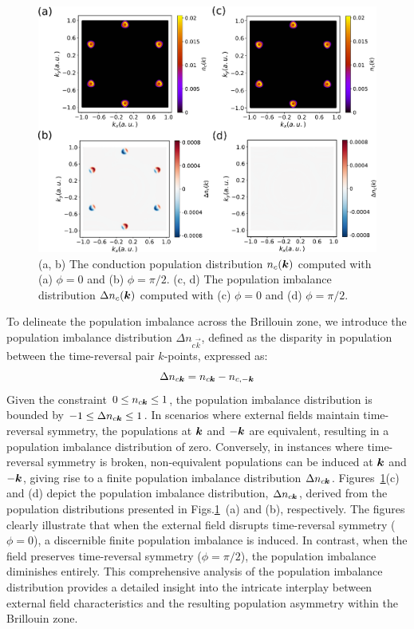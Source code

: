 \begin{figure}[htbp]
\centering
 \includegraphics[width=1.0\linewidth]{pic/population.pdf}
\caption{\label{fig:population} 
(a, b) The conduction population distribution $n_c(\boldsymbol k)$ computed with (a) $\phi=0$ and (b) $\phi=\pi/2$. (c, d) The population imbalance distribution $\Delta n_c(\boldsymbol k)$ computed with (c) $\phi=0$ and (d) $\phi=\pi/2$.}
\end{figure}


To delineate the population imbalance across the Brillouin zone, we introduce the population imbalance distribution $\Delta n_{c\vec{k}}$, defined as the disparity in population between the time-reversal pair $k$-points, expressed as:
\begin{equation}
 \Delta n_{c\boldsymbol{k}}=n_{c\boldsymbol{k}}-n_{c, -\boldsymbol{k}}  
\label{pop_imbalance }
\end{equation}
Given the constraint $0 \le n_{c\boldsymbol{k}} \le 1$, the population imbalance distribution is bounded by $-1 \le \Delta n_{c\boldsymbol{k}} \le 1$. In scenarios where external fields maintain time-reversal symmetry, the populations at $\boldsymbol{k}$ and $-\boldsymbol{k}$ are equivalent, resulting in a population imbalance distribution of zero. Conversely, in instances where time-reversal symmetry is broken, non-equivalent populations can be induced at $\boldsymbol{k}$ and $-\boldsymbol{k}$, giving rise to a finite population imbalance distribution $\Delta n_{c\boldsymbol{k}}$.
Figures~\ref{fig:population}(c) and (d) depict the population imbalance distribution, $\Delta n_{c\boldsymbol{k}}$, derived from the population distributions presented in Figs.\ref{fig:population}~(a) and (b), respectively. The figures clearly illustrate that when the external field disrupts time-reversal symmetry ($\phi=0$), a discernible finite population imbalance is induced. In contrast, when the field preserves time-reversal symmetry ($\phi=\pi/2$), the population imbalance diminishes entirely. This comprehensive analysis of the population imbalance distribution provides a detailed insight into the intricate interplay between external field characteristics and the resulting population asymmetry within the Brillouin zone.


